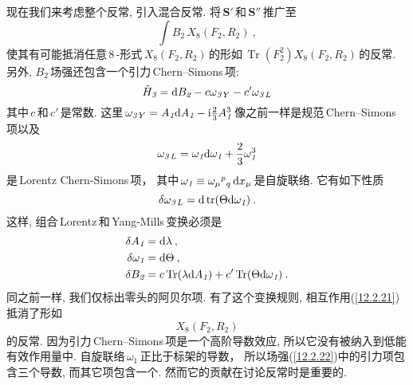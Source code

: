 现在我们来考虑整个反常, 引入混合反常. 将$\,\bm{S}'\,$和$\,\bm{S}''\,$推广至
\begin{equation}
    \int B_{\textit{2}}\,X_{\textit{8}}(F_{\textit{2}},R_{\textit{2}}) \:, \label{12.2.21}
\end{equation}
使其有可能抵消任意\,8\,-形式$\,X_{\textit{8}}(F_{\textit{2}},R_{\textit{2}})\,$的形如$\,\operatorname{Tr}(F_{\textit{2}}^{2})X_{\textit{8}}(F_{\textit{2}},R_{\textit{2}})\,$的反常. 另外, $B_{\textit{2}}\,$场强还包含一个引力\,Chern--Simons\,项:
\begin{equation}
    \tilde{H}_{\textit{3}} =\mathrm{d} B_{\textit{2}} - c\omega_{\textit{3}\,Y}
    -c'\omega_{\textit{3}\,L} \label{12.2.22}
\end{equation}
其中$\,c\,$和$\,c'\,$是常数. 这里$\,\omega_{\textit{3}\,Y}=A_{\textit{1}}\mathrm{d} A_{\textit{1}}-\mathrm{i}\frac{2}{3}A_{\textit{1}}^{3}\,$像之前一样是规范\,Chern--Simons\,项以及
\begin{equation}
    \omega_{\textit{3}\,L}=\omega_{\textit{1}}\mathrm{d} \omega_{\textit{1}} 
    +\frac{2}{3}\omega_{\textit{1}}^{3} \label{12.2.23}
\end{equation}
是\,Lorentz Chern-Simons\,项， 其中$\,\omega_{\textit{1}}\equiv \omega_{\mu}{}^{p}{}_{q}\,\mathrm{d} x_{\mu}\,$是自旋联络. 它有如下性质
\begin{equation}
    \delta\omega_{\textit{3}\,L} = \mathrm{d} \operatorname{tr}(\Theta\mathrm{d} \omega_{\textit{1}}) \:. \label{12.2.24}
\end{equation}
这样, 组合\,Lorentz\,和\,Yang-Mills\,变换必须是
\begin{subequations}  \label{12.2.25}
    \begin{align}
        \delta A_{\textit{1}} &= \mathrm{d} \lambda \:, \label{12.2.25a} \\
        \delta \omega_{\textit{1}} &= \mathrm{d} \Theta \:, \label{12.2.25b} \\
        \delta B_{\textit{2}} &= c\operatorname{Tr}(\lambda\mathrm{d} A_{\textit{1}})+c'\operatorname{Tr}(\Theta\mathrm{d} \omega_{\textit{1}}) \:. \label{12.2.25c}
    \end{align}
\end{subequations}
同之前一样, 我们仅标出零头的阿贝尔项. 有了这个变换规则, 相互作用(\ref{12.2.21})抵消了形如
\begin{equation}
        [c\operatorname{Tr}(F_{\textit{2}}^{2})+c'\operatorname{Tr}(R_{\textit{2}}^{2})] X_{\textit{8}}(F_{\textit{2}},R_{\textit{2}})  
        \label{12.2.26}
\end{equation}
的反常. 因为引力\,Chern--Simons\,项是一个高阶导数效应, 所以它没有被纳入到低能有效作用量中. 自旋联络$\,\omega_{\textit{1}}\,$正比于标架的导数， 所以场强(\ref{12.2.22})中的引力项包含三个导数, 而其它项包含一个. 然而它的贡献在讨论反常时是重要的.

